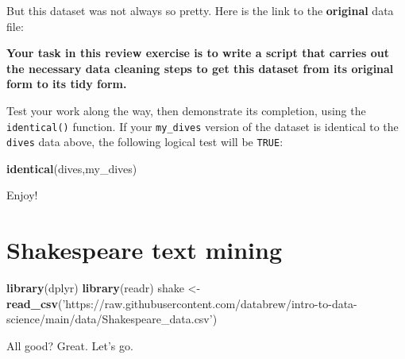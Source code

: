 \documentclass[
]{book}
\newenvironment{Shaded}{\begin{snugshade}}{\end{snugshade}}
\newcommand{\KeywordTok}[1]{\textcolor[rgb]{0.13,0.29,0.53}{\textbf{#1}}}
\newcommand{\NormalTok}[1]{#1}
\newcommand{\StringTok}[1]{\textcolor[rgb]{0.31,0.60,0.02}{#1}}
\begin{document}
But this dataset was not always so pretty. Here is the link to the \textbf{original} data file:

\textbf{Your task in this review exercise is to write a script that carries out the necessary data cleaning steps to get this dataset from its original form to its tidy form.}

Test your work along the way, then demonstrate its completion, using the \texttt{identical()} function. If your \texttt{my\_dives} version of the dataset is identical to the \texttt{dives} data above, the following logical test will be \texttt{TRUE}:

\begin{Shaded}
\begin{Highlighting}[]
\KeywordTok{identical}\NormalTok{(dives,my_dives)}
\end{Highlighting}
\end{Shaded}

Enjoy!

\hypertarget{shakespeare-text-mining}{%
\chapter{Shakespeare text mining}\label{shakespeare-text-mining}}

\begin{Shaded}
\begin{Highlighting}[]
\KeywordTok{library}\NormalTok{(dplyr)}
\KeywordTok{library}\NormalTok{(readr)}
\NormalTok{shake <-}\StringTok{ }\KeywordTok{read_csv}\NormalTok{(}\StringTok{'https://raw.githubusercontent.com/databrew/intro-to-data-science/main/data/Shakespeare_data.csv'}\NormalTok{)}
\end{Highlighting}
\end{Shaded}

All good? Great. Let's go.
\end{document}

